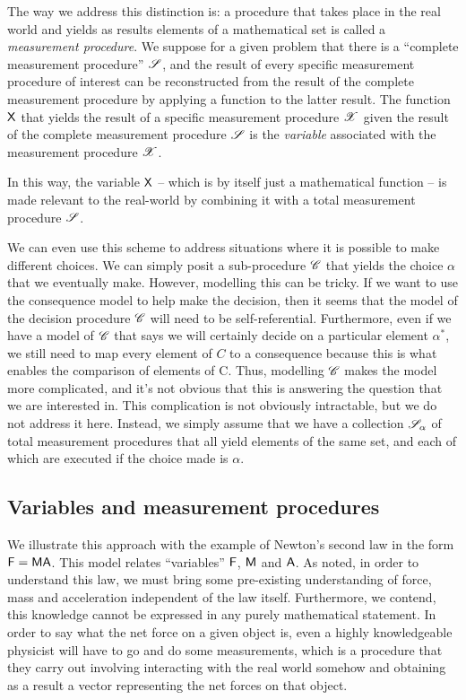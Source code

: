 The way we address this distinction is: a procedure that takes place in the real world and yields as results elements of a mathematical set is called a \emph{measurement procedure}. We suppose for a given problem that there is a ``complete measurement procedure'' $\mathscr{S}$, and the result of every specific measurement procedure of interest can be reconstructed from the result of the complete measurement procedure by applying a function to the latter result. The function $\mathsf{X}$ that yields the result of a specific measurement procedure $\mathscr{X}$ given the result of the complete measurement procedure $\mathscr{S}$ is the \emph{variable} associated with the measurement procedure $\mathscr{X}$.

In this way, the variable $\mathsf{X}$ -- which is by itself just a mathematical function -- is made relevant to the real-world by combining it with a total measurement procedure $\mathscr{S}$.

We can even use this scheme to address situations where it is possible to make different choices. We can simply posit a sub-procedure $\mathscr{C}$ that yields the choice $\alpha$ that we eventually make. However, modelling this can be tricky. If we want to use the consequence model to help make the decision, then it seems that the model of the decision procedure $\mathscr{C}$ will need to be self-referential. Furthermore, even if we have a model of $\mathscr{C}$ that says we will certainly decide on a particular element $\alpha^*$, we still need to map every element of $C$ to a consequence because this is what enables the comparison of elements of C. Thus, modelling $\mathscr{C}$ makes the model more complicated, and it's not obvious that this is answering the question that we are interested in. This complication is not obviously intractable, but we do not address it here. Instead, we simply assume that we have a collection $\mathscr{S}_\alpha$ of total measurement procedures that all yield elements of the same set, and each of which are executed if the choice made is $\alpha$.

\subsection{Variables and measurement procedures}

We illustrate this approach with the example of Newton's second law in the form $\mathsf{F}=\mathsf{MA}$. This model relates ``variables'' $\mathsf{F}$, $\mathsf{M}$ and $\mathsf{A}$. As \citet{feynman_feynman_1979} noted, in order to understand this law, we must bring some pre-existing understanding of force, mass and acceleration independent of the law itself. Furthermore, we contend, this knowledge cannot be expressed in any purely mathematical statement. In order to say what the net force on a given object is, even a highly knowledgeable physicist will have to go and do some measurements, which is a procedure that they carry out involving interacting with the real world somehow and obtaining as a result a vector representing the net forces on that object.

